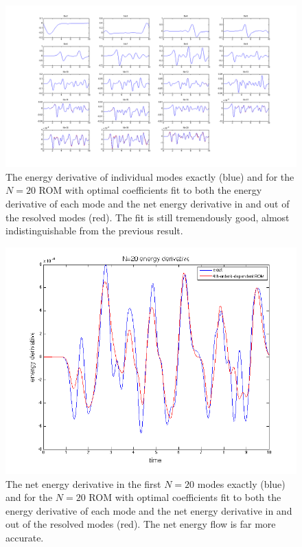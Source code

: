 \documentclass{article}
\begin{document}
\begin{figure}[h]
\includegraphics[width=\textwidth]{individual_modes_k.png}
\caption{The energy derivative of individual modes exactly (blue) and for the $N=20$ ROM with optimal coefficients fit to both the energy derivative of each mode and the net energy derivative in and out of the resolved modes (red). The fit is still tremendously good, almost indistinguishable from the previous result.}\label{fig:individual_modes_both_k}
\end{figure}

\begin{figure}[h]
\includegraphics[width=\textwidth]{energy_both.png}
\caption{The net energy derivative in the first $N=20$ modes exactly (blue) and for the $N=20$ ROM with optimal coefficients fit to both the energy derivative of each mode and the net energy derivative in and out of the resolved modes (red). The net energy flow is far more accurate.}\label{fig:k_dependent_both_net}
\end{figure}
\end{document}

